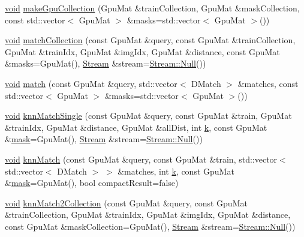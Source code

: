 \begin{DoxyCompactItemize}
\item 
\hyperlink{legacy_8hpp_a8bb47f092d473522721002c86c13b94e}{void} \hyperlink{classcv_1_1gpu_1_1BruteForceMatcher__GPU__base_a035729ea228ce8d8e620455b829dc03c}{make\-Gpu\-Collection} (Gpu\-Mat \&train\-Collection, Gpu\-Mat \&mask\-Collection, const std\-::vector$<$ Gpu\-Mat $>$ \&masks=std\-::vector$<$ Gpu\-Mat $>$())
\item 
\hyperlink{legacy_8hpp_a8bb47f092d473522721002c86c13b94e}{void} \hyperlink{classcv_1_1gpu_1_1BruteForceMatcher__GPU__base_ab48929d300a9ab4947712d4066c9f7fb}{match\-Collection} (const Gpu\-Mat \&query, const Gpu\-Mat \&train\-Collection, Gpu\-Mat \&train\-Idx, Gpu\-Mat \&img\-Idx, Gpu\-Mat \&distance, const Gpu\-Mat \&masks=Gpu\-Mat(), \hyperlink{classcv_1_1gpu_1_1Stream}{Stream} \&stream=\hyperlink{classcv_1_1gpu_1_1Stream_af96c23564834f88333dcb8997df553f1}{Stream\-::\-Null}())
\item 
\hyperlink{legacy_8hpp_a8bb47f092d473522721002c86c13b94e}{void} \hyperlink{classcv_1_1gpu_1_1BruteForceMatcher__GPU__base_a30f1bef48b425a91b2530561bc8646ba}{match} (const Gpu\-Mat \&query, std\-::vector$<$ D\-Match $>$ \&matches, const std\-::vector$<$ Gpu\-Mat $>$ \&masks=std\-::vector$<$ Gpu\-Mat $>$())
\item 
\hyperlink{legacy_8hpp_a8bb47f092d473522721002c86c13b94e}{void} \hyperlink{classcv_1_1gpu_1_1BruteForceMatcher__GPU__base_a1d88958855940436281245bb3aa677d6}{knn\-Match\-Single} (const Gpu\-Mat \&query, const Gpu\-Mat \&train, Gpu\-Mat \&train\-Idx, Gpu\-Mat \&distance, Gpu\-Mat \&all\-Dist, int \hyperlink{legacy_8hpp_a7be9b6436e5ea72ff5d5a66779b4bd38}{k}, const Gpu\-Mat \&\hyperlink{tracking_8hpp_a6b13ecd2fd6ec7ad422f1d7863c3ad19}{mask}=Gpu\-Mat(), \hyperlink{classcv_1_1gpu_1_1Stream}{Stream} \&stream=\hyperlink{classcv_1_1gpu_1_1Stream_af96c23564834f88333dcb8997df553f1}{Stream\-::\-Null}())
\item 
\hyperlink{legacy_8hpp_a8bb47f092d473522721002c86c13b94e}{void} \hyperlink{classcv_1_1gpu_1_1BruteForceMatcher__GPU__base_a3e21f04227d4b8fe358ca3b337bde8bb}{knn\-Match} (const Gpu\-Mat \&query, const Gpu\-Mat \&train, std\-::vector$<$ std\-::vector$<$ D\-Match $>$ $>$ \&matches, int \hyperlink{legacy_8hpp_a7be9b6436e5ea72ff5d5a66779b4bd38}{k}, const Gpu\-Mat \&\hyperlink{tracking_8hpp_a6b13ecd2fd6ec7ad422f1d7863c3ad19}{mask}=Gpu\-Mat(), bool compact\-Result=false)
\item 
\hyperlink{legacy_8hpp_a8bb47f092d473522721002c86c13b94e}{void} \hyperlink{classcv_1_1gpu_1_1BruteForceMatcher__GPU__base_a35b2dff5081dc07b33e630e796bb4130}{knn\-Match2\-Collection} (const Gpu\-Mat \&query, const Gpu\-Mat \&train\-Collection, Gpu\-Mat \&train\-Idx, Gpu\-Mat \&img\-Idx, Gpu\-Mat \&distance, const Gpu\-Mat \&mask\-Collection=Gpu\-Mat(), \hyperlink{classcv_1_1gpu_1_1Stream}{Stream} \&stream=\hyperlink{classcv_1_1gpu_1_1Stream_af96c23564834f88333dcb8997df553f1}{Stream\-::\-Null}())

\end{DoxyCompactItemize}
